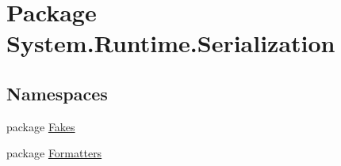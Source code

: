 \hypertarget{namespace_system_1_1_runtime_1_1_serialization}{\section{Package System.\-Runtime.\-Serialization}
\label{namespace_system_1_1_runtime_1_1_serialization}
}
\subsection*{Namespaces}
\begin{DoxyCompactItemize}
\item 
package \hyperlink{namespace_system_1_1_runtime_1_1_serialization_1_1_fakes}{Fakes}
\item 
package \hyperlink{namespace_system_1_1_runtime_1_1_serialization_1_1_formatters}{Formatters}
\end{DoxyCompactItemize}
